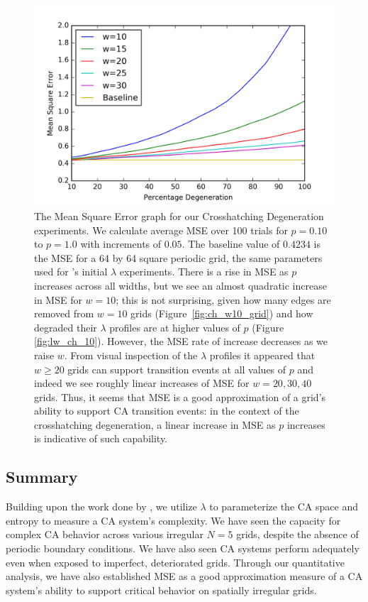 \documentclass[a4paper,11pt]{article}
\begin{document}
\begin{figure}[htp]
\centering
\includegraphics[width=\textwidth]{ch6_figs/ch_mse_10_30}
\caption[Mean Squared Error for Crosshatching Degeneration]{
  The Mean Square Error graph for our Crosshatching Degeneration experiments. We calculate average MSE over 100 trials for $p=0.10$ to $p=1.0$ with increments of $0.05$. The baseline value of $0.4234$ is the MSE for a 64 by 64 square periodic grid, the same parameters used for \citeauthor{wo90}'s initial $\lambda$ experiments. There is a rise in MSE as $p$ increases across all widths, but we see an almost quadratic increase in MSE for $w=10$; this is not surprising, given how many edges are removed from $w=10$ grids (Figure~\ref{fig:ch_w10_grid}) and how degraded their $\lambda$ profiles are at higher values of $p$ (Figure  \ref{fig:lw_ch_10}). However, the MSE rate of increase decreases as we raise $w$. From visual inspection of the $\lambda$ profiles it appeared that $w \ge 20$ grids can support transition events at all values of $p$ and indeed we see roughly linear increases of MSE for $w=20,30,40$ grids. Thus, it seems that MSE is a good approximation of a grid's ability to support CA transition events: in the context of the crosshatching degeneration, a linear increase in MSE as $p$ increases is indicative of such capability.
}
\label{fig:ch_mse}
\end{figure}

\subsection{Summary}

Building upon the work done by \citeauthor{wo90}, we utilize $\lambda$ to parameterize the CA space and entropy to measure a CA system's complexity. We have seen the capacity for complex CA behavior across various irregular $N=5$ grids, despite the absence of periodic boundary conditions. We have also seen CA systems perform adequately even when exposed to imperfect, deteriorated grids. Through our quantitative analysis, we have also established MSE as a good approximation measure of a CA system's ability to support critical behavior on spatially irregular grids.
\end{document}
